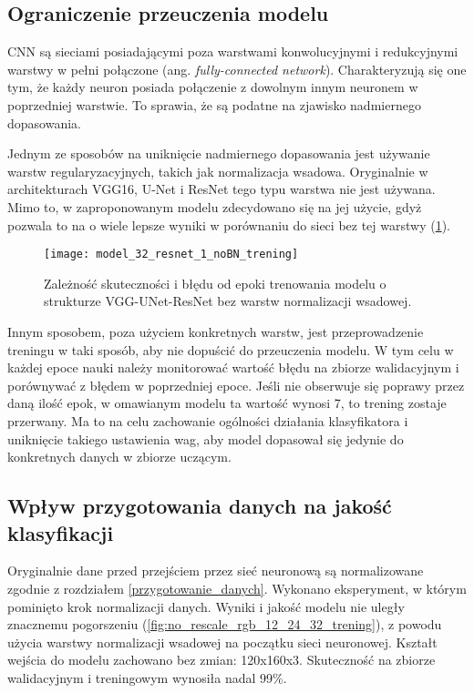\subsection{Ograniczenie przeuczenia modelu}
CNN są sieciami posiadającymi poza warstwami konwolucyjnymi i redukcyjnymi warstwy w pełni połączone (ang. \textit{fully-connected network}). Charakteryzują się one tym, że każdy neuron posiada połączenie z dowolnym innym neuronem w poprzedniej warstwie. To sprawia, że są podatne na zjawisko nadmiernego dopasowania. 

{\parindent0pt
Jednym ze sposobów na uniknięcie nadmiernego dopasowania jest używanie warstw regularyzacyjnych, takich jak normalizacja wsadowa. Oryginalnie w architekturach VGG16, U-Net i ResNet tego typu warstwa nie jest używana. Mimo to, w zaproponowanym modelu zdecydowano się na jej użycie, gdyż pozwala to na o wiele lepsze wyniki w porównaniu do sieci bez tej warstwy (\ref{fig:model_32_resnet_1_noBN_trening}).

\begin{figure}[h!]
	\centering
	\centering
		\texttt{[image: model\_32\_resnet\_1\_noBN\_trening]}	
	\caption{Zależność skuteczności i błędu od epoki trenowania modelu o strukturze VGG-UNet-ResNet bez warstw normalizacji wsadowej.}	\label{fig:model_32_resnet_1_noBN_trening}
\end{figure}

Innym sposobem, poza użyciem konkretnych warstw, jest przeprowadzenie treningu w taki sposób, aby nie dopuścić do przeuczenia modelu. W tym celu w każdej epoce nauki należy monitorować wartość błędu na zbiorze walidacyjnym i porównywać z błędem w poprzedniej epoce. Jeśli nie obserwuje się poprawy przez daną ilość epok, w omawianym modelu ta wartość wynosi 7, to trening zostaje przerwany. Ma to na celu zachowanie ogólności działania klasyfikatora i uniknięcie takiego ustawienia wag, aby model dopasował się jedynie do konkretnych danych w zbiorze uczącym. 
}

\subsection{Wpływ przygotowania danych na jakość klasyfikacji}

Oryginalnie dane przed przejściem przez sieć neuronową są normalizowane zgodnie z rozdziałem \ref{przygotowanie_danych}. Wykonano eksperyment, w którym pominięto krok normalizacji danych. Wyniki i jakość modelu nie uległy znacznemu pogorszeniu (\ref{fig:no_rescale_rgb_12_24_32_trening}), z powodu użycia warstwy normalizacji wsadowej na początku sieci neuronowej. Kształt wejścia do modelu zachowano bez zmian: 120x160x3. Skuteczność na zbiorze walidacyjnym i treningowym wynosiła nadal 99\%.

